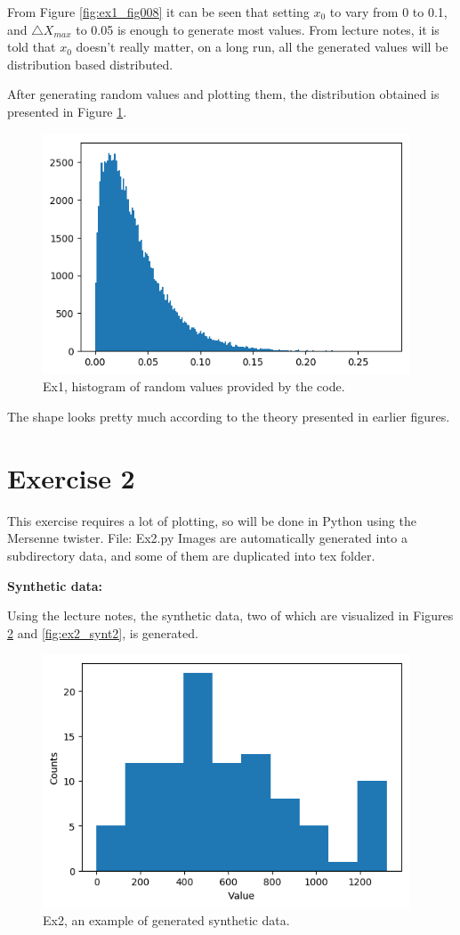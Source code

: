 \documentclass{article}
\begin{document}
From Figure \ref{fig:ex1_fig008} it can be seen that setting $x_0$ to vary from 0 to 0.1, and $\triangle X_{max}$ to 0.05 is enough to generate most values. From lecture notes, it is told that $x_0$ doesn't really matter, on a long run, all the generated values will be distribution based distributed.

After generating random values and plotting them, the distribution obtained is presented in Figure \ref{fig:ex1_myDistribution}.

\begin{figure}[!hbt]
	\centering
	\includegraphics[width=4.3in]{ex1_myDistribution}
	\caption{Ex1, histogram of random values provided by the code.}
	\label{fig:ex1_myDistribution}
\end{figure}

The shape looks pretty much according to the theory presented in earlier figures.


\clearpage

\section{Exercise 2}
This exercise requires a lot of plotting, so will be done in Python using the Mersenne twister. File: Ex2.py
Images are automatically generated into a subdirectory data, and some of them are duplicated into tex folder.


\textbf{Synthetic data:}

Using the lecture notes, the synthetic data, two of which are visualized in Figures \ref{fig:ex2_synt1} and \ref{fig:ex2_synt2}, is generated.
\begin{figure}[!hbt]
	\centering
	\includegraphics[width=4.3in]{ex2_synt1}
	\caption{Ex2, an example of generated synthetic data.}
	\label{fig:ex2_synt1}
\end{figure}
\end{document}
